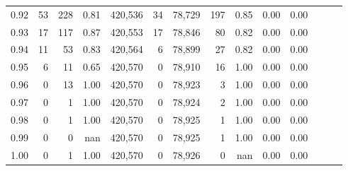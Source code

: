 \begin{tabular}{rrrrrrrrrrrrrr}
0.92 &     53 &    228 &  0.81 &  420,536 &       34 &  78,729 &     197 &  0.85 &  0.00 &      0.00 \\
0.93 &     17 &    117 &  0.87 &  420,553 &       17 &  78,846 &      80 &  0.82 &  0.00 &      0.00 \\
0.94 &     11 &     53 &  0.83 &  420,564 &        6 &  78,899 &      27 &  0.82 &  0.00 &      0.00 \\
0.95 &      6 &     11 &  0.65 &  420,570 &        0 &  78,910 &      16 &  1.00 &  0.00 &      0.00 \\
0.96 &      0 &     13 &  1.00 &  420,570 &        0 &  78,923 &       3 &  1.00 &  0.00 &      0.00 \\
0.97 &      0 &      1 &  1.00 &  420,570 &        0 &  78,924 &       2 &  1.00 &  0.00 &      0.00 \\
0.98 &      0 &      1 &  1.00 &  420,570 &        0 &  78,925 &       1 &  1.00 &  0.00 &      0.00 \\
0.99 &      0 &      0 &   nan &  420,570 &        0 &  78,925 &       1 &  1.00 &  0.00 &      0.00 \\
1.00 &      0 &      1 &  1.00 &  420,570 &        0 &  78,926 &       0 &   nan &  0.00 &      0.00 \\
\bottomrule
\end{tabular}
